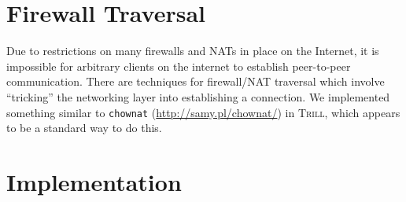 \documentclass[12pt]{article}
\newcommand{\Trill}{\textsc{Trill}\xspace}
\begin{document}

\section*{Firewall Traversal}
Due to restrictions on many firewalls and NATs in place on the Internet, it is
impossible for arbitrary clients on the internet to establish peer-to-peer
communication. There are techniques for firewall/NAT traversal which involve
``tricking'' the networking layer into establishing a connection. We implemented
something similar to \texttt{chownat} (\url{http://samy.pl/chownat/}) in \Trill,
which appears to be a standard way to do this.

\section*{Implementation}
\end{document}
